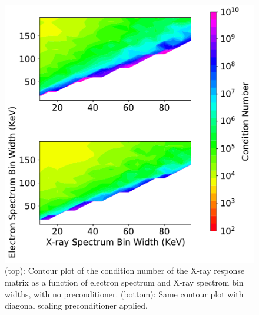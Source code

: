 \begin{figure}[h]
    \centering
    \includegraphics[width=.5\textwidth]{figures/chapter_4/condition_number_binning_diagonal_scaling/fig.pdf}
    \caption{(top): Contour plot of the condition number of the X-ray response matrix as a function of electron spectrum and X-ray spectrom bin widths, with no preconditioner. (bottom): Same contour plot with diagonal scaling preconditioner applied.}
    \label{matrix_spectral_plot_diagonal_scaling}
\end{figure}

